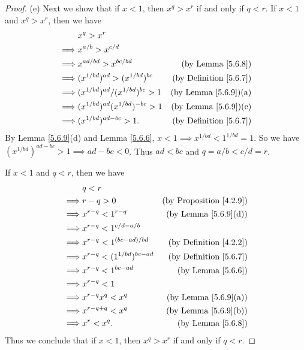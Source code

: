 \begin{proof}{(e)}
Next we show that if \(x < 1\), then \(x^q > x^r\) if and only if \(q < r\).
If \(x < 1\) and \(x^q > x^r\), then we have
\begin{align*}
& x^q > x^r \\
\implies & x^{a / b} > x^{c / d} \\
\implies & x^{ad / bd} > x^{bc / bd} & \text{(by Lemma \ref{5.6.8})} \\
\implies & (x^{1 / bd})^{ad} > (x^{1 / bd})^{bc} & \text{(by Definition \ref{5.6.7})} \\
\implies & (x^{1 / bd})^{ad} / (x^{1 / bd})^{bc} > 1 & \text{(by Lemma \ref{5.6.9})(a)} \\
\implies & (x^{1 / bd})^{ad} (x^{1 / bd})^{-bc} > 1 & \text{(by Lemma \ref{5.6.9})(c)} \\
\implies & (x^{1 / bd})^{ad - bc} > 1. & \text{(by Definition \ref{5.6.7})}
\end{align*}
By Lemma \ref{5.6.9}(d) and Lemma \ref{5.6.6}, \(x < 1 \implies x^{1 / bd} < 1^{1 / bd} = 1\).
So we have \((x^{1 / bd})^{ad - bc} > 1 \implies ad - bc < 0\).
Thus \(ad < bc\) and \(q = a / b < c / d = r\).

If \(x < 1\) and \(q < r\), then we have
\begin{align*}
& q < r \\
\implies & r - q > 0 & \text{(by Proposition \ref{4.2.9})} \\
\implies & x^{r - q} < 1^{r - q} & \text{(by Lemma \ref{5.6.9}(d))} \\
\implies & x^{r - q} < 1^{c / d - a / b} \\
\implies & x^{r - q} < 1^{(bc - ad) / bd} & \text{(by Definition \ref{4.2.2})} \\
\implies & x^{r - q} < (1^{1 / bd})^{bc - ad} & \text{(by Definition \ref{5.6.7})} \\
\implies & x^{r - q} < 1^{bc - ad} & \text{(by Lemma \ref{5.6.6})} \\
\implies & x^{r - q} < 1 \\
\implies & x^{r - q} x^q < x^q & \text{(by Lemma \ref{5.6.9}(a))} \\
\implies & x^{r - q + q} < x^q & \text{(by Lemma \ref{5.6.9}(b))} \\
\implies & x^r < x^q. & \text{(by Lemma \ref{5.6.8})}
\end{align*}
Thus we conclude that if \(x < 1\), then \(x^q > x^r\) if and only if \(q < r\).
\end{proof}

\exercisesection

